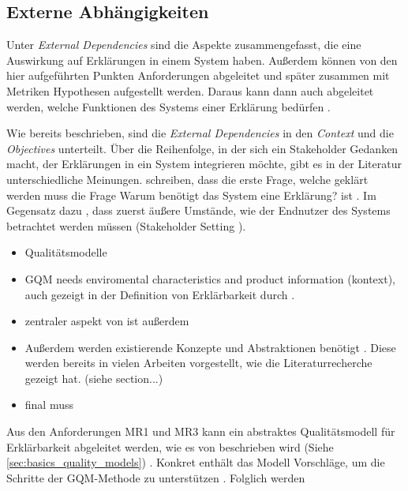 \subsection{Externe Abhängigkeiten}
\label{sec:model_external_dependencies}

Unter \textit{External Dependencies} sind die Aspekte zusammengefasst, die eine Auswirkung auf Erklärungen in einem System haben. Außerdem können von den hier aufgeführten Punkten Anforderungen abgeleitet und später zusammen mit Metriken Hypothesen aufgestellt werden. Daraus kann dann auch abgeleitet werden, welche Funktionen des Systems einer Erklärung bedürfen \cite{kohl_explainability_2019}.

Wie bereits beschrieben, sind die \textit{External Dependencies} in den \textit{Context} und die \textit{Objectives} unterteilt. Über die Reihenfolge, in der sich ein Stakeholder Gedanken macht, der Erklärungen in ein System integrieren möchte, gibt es in der Literatur unterschiedliche Meinungen. \citeauthor{rosenfeld_explainability_2019} schreiben, dass die erste Frage, welche geklärt werden muss die Frage \glqq Warum benötigt das System eine Erklärung?\grqq{} ist \cite[vgl. S. 699][]{rosenfeld_explainability_2019}. Im Gegensatz dazu \citeauthor{cirqueira_scenario-based_2020}, dass zuerst äußere Umstände, wie der Endnutzer des Systems betrachtet werden müssen (\glqq Stakeholder Setting\grqq{} \cite{cirqueira_scenario}).

\begin{itemize}
    \item Qualitätsmodelle \cite{schneider2012abenteuer}
    \item GQM \cite{briand1995goal, schneider2012abenteuer} needs enviromental characteristics and product information (kontext), auch gezeigt in der Definition von Erklärbarkeit durch \cite{chazette_knowledge_nodate}.
    \item zentraler aspekt von \cite{briand1995goal} ist außerdem 
    \item Außerdem werden existierende Konzepte und Abstraktionen benötigt \cite{briand1995goal}. Diese werden bereits in vielen Arbeiten vorgestellt, wie die Literaturrecherche gezeigt hat. (siehe section...)
    \item final muss 
\end{itemize}

Aus den Anforderungen MR1 und MR3 kann ein abstraktes Qualitätsmodell für Erklärbarkeit abgeleitet werden, wie es von \citeauthor{schneider2012abenteuer} beschrieben wird (Siehe \autoref{sec:basics_quality_models}) \cite{schneider2012abenteuer}. Konkret enthält das Modell Vorschläge, um die Schritte der GQM-Methode zu unterstützen \cite{briand1995goal, schneider2012abenteuer}. Folglich werden 


